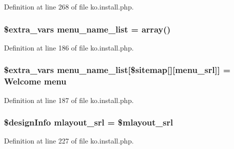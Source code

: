 Definition at line 268 of file ko.\+install.\+php.

\hypertarget{ko_8install_8php_a9223cf55eb6ff5239c0396968e619fbe}{}
\subsubsection[{menu\+\_\+name\+\_\+list}]{\setlength{\rightskip}{0pt plus 5cm}\${\bf extra\+\_\+vars} menu\+\_\+name\+\_\+list = array()}\label{ko_8install_8php_a9223cf55eb6ff5239c0396968e619fbe}


Definition at line 186 of file ko.\+install.\+php.

\hypertarget{ko_8install_8php_a5e00e121a1038ef3c304b7f78488d102}{}
\subsubsection[{menu\+\_\+name\+\_\+list}]{\setlength{\rightskip}{0pt plus 5cm}\${\bf extra\+\_\+vars} menu\+\_\+name\+\_\+list\mbox{[}\$sitemap\mbox{[}\textquotesingle{}\mbox{]}\mbox{[}\textquotesingle{}menu\+\_\+srl\textquotesingle{}\mbox{]}\mbox{]} = \textquotesingle{}Welcome {\bf menu}\textquotesingle{}}\label{ko_8install_8php_a5e00e121a1038ef3c304b7f78488d102}


Definition at line 187 of file ko.\+install.\+php.

\hypertarget{ko_8install_8php_a9cf497537007b08c645bed35f564be54}{}
\subsubsection[{mlayout\+\_\+srl}]{\setlength{\rightskip}{0pt plus 5cm}\$design\+Info mlayout\+\_\+srl = \$mlayout\+\_\+srl}\label{ko_8install_8php_a9cf497537007b08c645bed35f564be54}


Definition at line 227 of file ko.\+install.\+php.

\hypertarget{ko_8install_8php_a5c3fc1968f94c2b6a7c60845f284de78}{}
